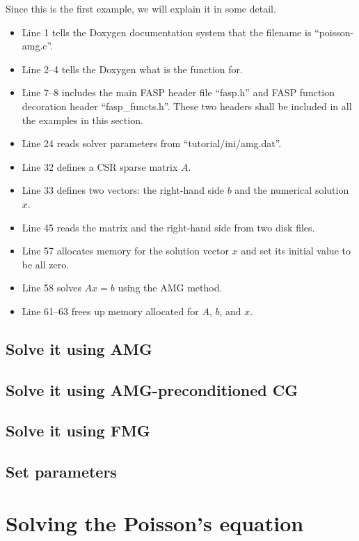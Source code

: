 \documentclass[11pt]{memoir}
\begin{document}
Since this is the first example, we will explain it in some detail. 
\begin{itemize}
%
\item Line 1 tells the Doxygen documentation system that the filename is ``poisson-amg.c''. 
%
\item Line 2--4 tells the Doxygen what is the function for. 
%
\item Line 7--8 includes the main FASP header file ``fasp.h'' and FASP function decoration header ``fasp\_functs.h''. These two headers shall be included in all the examples in this section.
%
\item Line 24 reads solver parameters from ``tutorial/ini/amg.dat''.
%
\item Line 32 defines a CSR sparse matrix $A$.
%
\item Line 33 defines two vectors: the right-hand side $b$ and the numerical solution $x$.
%
\item Line 45 reads the matrix and the right-hand side from two disk files.
%
\item Line 57 allocates memory for the solution vector $x$ and set its initial value to be all zero. 
%
\item Line 58 solves $Ax=b$ using the AMG method.
%
\item Line 61--63 frees up memory allocated for $A$, $b$, and $x$.
\end{itemize}



\subsection{Solve it using AMG}

\subsection{Solve it using AMG-preconditioned CG}

\subsection{Solve it using FMG}

\subsection{Set parameters}

\section{Solving the Poisson's equation}
\end{document}
